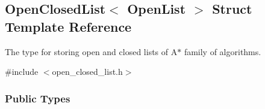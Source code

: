 \hypertarget{structOpenClosedList}{}\subsection{Open\+Closed\+List$<$ Open\+List $>$ Struct Template Reference}
\label{structOpenClosedList}


The type for storing open and closed lists of {\ttfamily A$\ast$} family of algorithms.  




{\ttfamily \#include $<$open\+\_\+closed\+\_\+list.\+h$>$}

\subsubsection*{Public Types}
